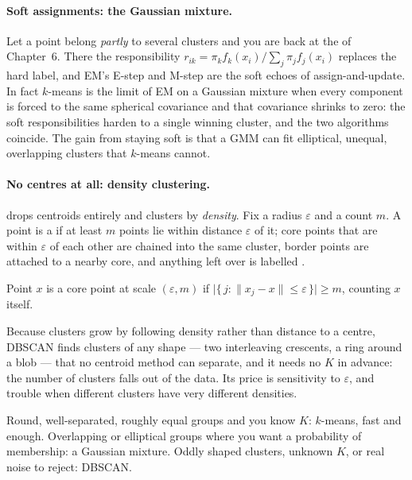 \documentclass[11pt]{article}
\begin{document}
\paragraph{Soft assignments: the Gaussian mixture.}
Let a point belong \emph{partly} to several clusters and you are back at the
 of Chapter~6. There the responsibility
$r_{ik}=\pi_k f_k(x_i)/\sum_j \pi_j f_j(x_i)$ replaces the hard label, and EM's
E-step and M-step are the soft echoes of assign-and-update. In fact $k$-means
is the limit of EM on a Gaussian mixture when every component is forced to the
same spherical covariance and that covariance shrinks to zero: the soft
responsibilities harden to a single winning cluster, and the two algorithms
coincide. The gain from staying soft is that a GMM can fit elliptical,
unequal, overlapping clusters that $k$-means cannot.

\paragraph{No centres at all: density clustering.}
 drops centroids entirely and clusters by \emph{density}. Fix a
radius $\varepsilon$ and a count $m$. A point is a  if at
least $m$ points lie within distance $\varepsilon$ of it; core points that are
within $\varepsilon$ of each other are chained into the same cluster, border
points are attached to a nearby core, and anything left over is labelled
.

\begin{definition}
Point $x$ is a core point at scale $(\varepsilon, m)$ if
$\bigl|\{\,j : \|x_j - x\| \le \varepsilon\,\}\bigr| \ge m$,
counting $x$ itself.
\end{definition}

\noindent Because clusters grow by following density rather than distance to a
centre, DBSCAN finds clusters of any shape --- two interleaving crescents, a
ring around a blob --- that no centroid method can separate, and it needs no
$K$ in advance: the number of clusters falls out of the data. Its price is
sensitivity to $\varepsilon$, and trouble when different clusters have very
different densities.

\begin{example}
Round, well-separated, roughly equal groups and you know $K$: $k$-means, fast
and enough. Overlapping or elliptical groups where you want a probability of
membership: a Gaussian mixture. Oddly shaped clusters, unknown $K$, or real
noise to reject: DBSCAN.
\end{example}
\end{document}
